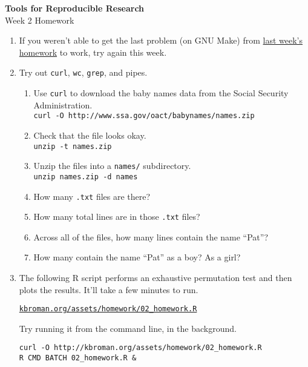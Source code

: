 \documentclass[12pt]{article}
\newcommand{\ttsm}{\tt \small}
\begin{document}
\thispagestyle{empty}

\textbf{Tools for Reproducible Research} \\
Week 2 Homework

\bigskip

\begin{enumerate}

\item If you weren't able to get the last problem (on GNU Make) from
  \href{http://kbroman.org/Tools4RR/assets/homework/01_homework.pdf}{last week's homework}
  to work, try again this week.

\item Try out {\ttsm curl}, {\ttsm wc}, {\ttsm grep}, and pipes.

  \begin{enumerate}
  \item Use {\ttsm curl} to download the baby names data from the
    Social Security Administration. \\
    {\ttsm curl -O http://www.ssa.gov/oact/babynames/names.zip}

  \item Check that the file looks okay.\\
    {\ttsm unzip -t names.zip}

  \item Unzip the files into a {\ttsm names/} subdirectory.\\
    {\ttsm unzip names.zip -d names}

  \item How many {\ttsm .txt} files are there?

  \item How many total lines are in those {\ttsm .txt} files?

  \item Across all of the files, how many lines contain the name
    ``Pat''?

  \item How many contain the name ``Pat'' as a boy? As a girl?
  \end{enumerate}


\item The following R script performs an exhaustive permutation test and
  then plots the results. It'll take a few minutes to run.

  \href{http://kbroman.org/assets/homework/02_homework.R}{\ttsm kbroman.org/assets/homework/02\_homework.R}

  Try running it from the command line, in the background.

  {\ttsm curl -O http://kbroman.org/assets/homework/02\_homework.R} \\
  {\ttsm R CMD BATCH 02\_homework.R \&}

\end{enumerate}
\end{document}
